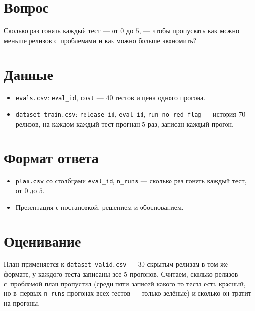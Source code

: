 \documentclass[11pt,a4paper]{article}
\begin{document}
\section*{Вопрос}
Сколько раз гонять каждый тест --- от $0$ до $5$, --- чтобы пропускать как можно меньше релизов с~проблемами и как можно больше экономить?

\section*{Данные}
\begin{itemize}
\item \texttt{evals.csv}: \texttt{eval\_id}, \texttt{cost} --- $40$ тестов и цена одного прогона.
\item \texttt{dataset\_train.csv}: \texttt{release\_id}, \texttt{eval\_id}, \texttt{run\_no}, \texttt{red\_flag} --- история $70$ релизов, на каждом каждый тест прогнан $5$ раз, записан каждый прогон.
\end{itemize}

\section*{Формат ответа}
\begin{itemize}
\item \texttt{plan.csv} со столбцами \texttt{eval\_id}, \texttt{n\_runs} --- сколько раз гонять каждый тест, от $0$ до $5$.
\item Презентация с постановкой, решением и обоснованием.
\end{itemize}

\section*{Оценивание}
План применяется к \texttt{dataset\_valid.csv} --- $30$ скрытым релизам в том же формате, у каждого теста записаны все $5$ прогонов. Считаем, сколько релизов с~проблемой план пропустил (среди пяти записей какого-то теста есть красный, но в~первых \texttt{n\_runs} прогонах всех тестов --- только зелёные) и сколько он тратит на прогоны.
\end{document}
